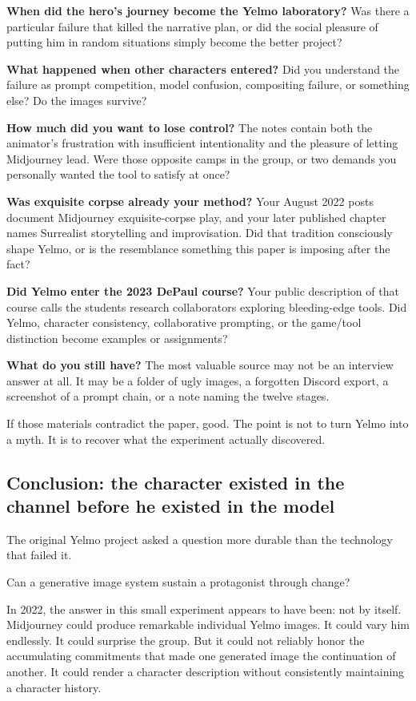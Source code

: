 \documentclass[
]{article}
\begin{document}
\textbf{When did the hero's journey become the Yelmo laboratory?} Was
there a particular failure that killed the narrative plan, or did the
social pleasure of putting him in random situations simply become the
better project?

\textbf{What happened when other characters entered?} Did you understand
the failure as prompt competition, model confusion, compositing failure,
or something else? Do the images survive?

\textbf{How much did you want to lose control?} The notes contain both
the animator's frustration with insufficient intentionality and the
pleasure of letting Midjourney lead. Were those opposite camps in the
group, or two demands you personally wanted the tool to satisfy at once?

\textbf{Was exquisite corpse already your method?} Your August 2022
posts document Midjourney exquisite-corpse play, and your later
published chapter names Surrealist storytelling and improvisation. Did
that tradition consciously shape Yelmo, or is the resemblance something
this paper is imposing after the fact?

\textbf{Did Yelmo enter the 2023 DePaul course?} Your public description
of that course calls the students research collaborators exploring
bleeding-edge tools. Did Yelmo, character consistency, collaborative
prompting, or the game/tool distinction become examples or assignments?

\textbf{What do you still have?} The most valuable source may not be an
interview answer at all. It may be a folder of ugly images, a forgotten
Discord export, a screenshot of a prompt chain, or a note naming the
twelve stages.

If those materials contradict the paper, good. The point is not to turn
Yelmo into a myth. It is to recover what the experiment actually
discovered.

\subsection{Conclusion: the character existed in the channel before he
existed in the
model}\label{conclusion-the-character-existed-in-the-channel-before-he-existed-in-the-model}

The original Yelmo project asked a question more durable than the
technology that failed it.

Can a generative image system sustain a protagonist through change?

In 2022, the answer in this small experiment appears to have been: not
by itself. Midjourney could produce remarkable individual Yelmo images.
It could vary him endlessly. It could surprise the group. But it could
not reliably honor the accumulating commitments that made one generated
image the continuation of another. It could render a character
description without consistently maintaining a character history.
\end{document}
